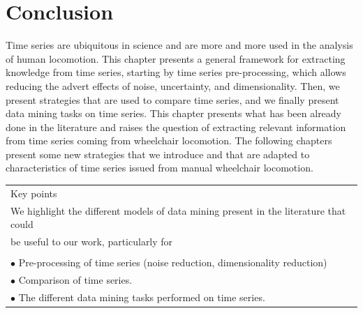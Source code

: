 \section{Conclusion}
Time series are ubiquitous in science and are more and more used in the analysis of human locomotion. This chapter presents a general framework for extracting knowledge from time series, starting by time series pre-processing, which allows reducing the advert effects of noise, uncertainty, and dimensionality. Then, we present strategies that are used to compare time series, and we finally present data mining tasks on time series. This chapter presents what has been already done in the literature and raises the question of extracting relevant information from time series coming from wheelchair locomotion. The following chapters present some new strategies that we introduce and that are adapted to characteristics of time series issued from manual wheelchair locomotion.

\begin{table}[ht]
\centering
\begin{tabular}{|l|}

\hline
\rowcolor{LavenderBlush}
Key points\\
We highlight the different models of data mining present in the literature that could\\ be useful to our work, particularly for  \\
\\
$\bullet$ Pre-processing of time series (noise reduction, dimensionality reduction) \\
$\bullet$ Comparison of time series.\\ 
$\bullet$ The different data mining tasks performed on time series.\\
\hline
\end{tabular}
\end{table}